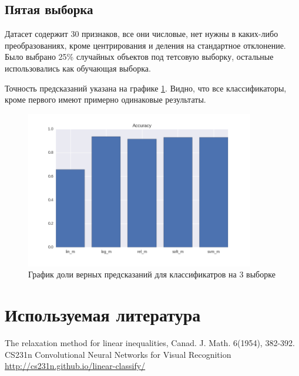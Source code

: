 \documentclass[a4paper]{article}
\begin{document}
\subsection{Пятая выборка}
Датасет содержит 30 признаков, все они числовые, нет нужны в каких-либо преобразованиях, кроме центрирования и деления на стандартное отклонение. Было выбрано 25\% случайных объектов под тетсовую выборку, остальные использовались как обучающая выборка.

Точность предсказаний указана на графике \ref{pic:im5}. Видно, что все классификаторы, кроме первого имеют примерно одинаковые результаты.

\begin{figure}[H]
\centering
\includegraphics[width=10cm]{fifth_dataset}
\caption{График доли верных предсказаний для классификатров на 3 выборке}
\label{pic:im5}
\end{figure}


\newpage
\section{Используемая литература}
\begin{thebibliography}{99}
 The relaxation method for linear inequalities, Canad. J. Math. 6(1954), 382-392.
 CS231n Convolutional Neural Networks for Visual Recognition \url{http://cs231n.github.io/linear-classify/}
\end{thebibliography}
\end{document}
